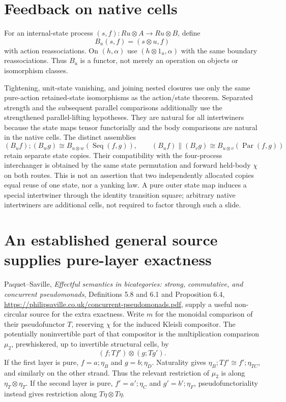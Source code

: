 \documentclass{article}
\begin{document}
\section{Feedback on native cells}
For an internal-state process $(s,f):Ru\otimes A\to Ru\otimes B$, define
\[
B_u(s,f)=(s\otimes u,f)
\]
with action reassociations. On $(h,\alpha)$ use $(h\otimes1_u,\alpha)$ with the same boundary reassociations. Thus $B_u$ is a functor, not merely an operation on objects or isomorphism classes.

Tightening, unit-state vanishing, and joining nested closures use only the same pure-action retained-state isomorphisms as the action/state theorem. Separated strength and the subsequent parallel comparisons additionally use the strengthened parallel-lifting hypotheses. They are natural for all intertwiners because the state maps tensor functorially and the body comparisons are natural in the native cells. The distinct assemblies
\[
(B_u f);(B_w g)\cong B_{u\otimes w}(\operatorname{Seq}(f,g)),\qquad
(B_u f)\parallel(B_v g)\cong B_{u\otimes v}(\operatorname{Par}(f,g))
\]
retain separate state copies. Their compatibility with the four-process interchanger is obtained by the same state permutation and forward held-body $\chi$ on both routes. This is not an assertion that two independently allocated copies equal reuse of one state, nor a yanking law. A pure outer state map induces a special intertwiner through the identity transition square; arbitrary native intertwiners are additional cells, not required to factor through such a slide.

\section{An established general source supplies pure-layer exactness}
Paquet--Saville, \emph{Effectful semantics in bicategories: strong, commutative, and concurrent pseudomonads}, Definitions 5.8 and 6.1 and Proposition 6.4, \url{https://philipsaville.co.uk/concurrent-pseudomonads.pdf}, supply a useful non-circular source for the extra exactness. Write $m$ for the monoidal comparison of their pseudofunctor $T$, reserving $\chi$ for the induced Kleisli compositor. The potentially noninvertible part of that compositor is the multiplication comparison $\mu_2$, prewhiskered, up to invertible structural cells, by
\[
(f;Tf')\otimes(g;Tg').
\]
If the first layer is pure, $f=a;\eta_B$ and $g=b;\eta_D$. Naturality gives $\eta_B;Tf'\cong f';\eta_{TC}$, and similarly on the other strand. Thus the relevant restriction of $\mu_2$ is along $\eta_T\otimes\eta_T$. If the second layer is pure, $f'=a';\eta_C$ and $g'=b';\eta_F$, pseudofunctoriality instead gives restriction along $T\eta\otimes T\eta$.
\end{document}

